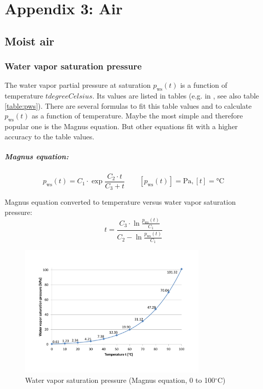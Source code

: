 \documentclass[11pt,a4paper,english,twoside]{scrreprt}
\newcommand{\gradC}{${}^\circ$C}      %
\begin{document}
\chapter{Appendix 3: Air}

\section{Moist air}
\label{chap:Moist air}

\subsection{Water vapor saturation pressure}

The water vapor partial pressure at saturation $p_\text{ws}(t)$ is a function of temperature $t\si{degreeCelsius}$. Its values are listed in tables (e.g. in \cite{HCP}, see also table \ref{table:pws}). There are several formulas to fit this table values and to calculate $p_\text{ws}(t)$ as a function of temperature. Maybe the most simple and therefore popular one is the Magnus equation. But other equations fit with a higher accuracy to the table values.

\paragraph{Magnus equation:}

\begin{equation}
  \label{eqn:Magnus}
  p_\text{ws}(t) =C_1 \cdot \exp \frac{C_2 \cdot t}{C_3 +t} \qquad [p_\text{ws}(t)] = \si{\pascal}, [t] = \si{\degreeCelsius} 
\end{equation}  

Magnus equation converted to temperature versus water vapor saturation pressure:
\[t=\frac{C_3 \cdot \ln \frac{p_\text{ws}(t)}{C_1}}{C_2 -\ln \frac{p_\text{ws}(t)}{C_1}}\]

\begin{figure}
  \centering
  \includegraphics*[width=0.8\textwidth,angle=0]{FCF_Diag_pws.pdf}
  \caption[Water vapor saturation pressure (Magnus equation)]{Water vapor saturation pressure (Magnus equation, 0 to 100\gradC) }
\end{figure}
\end{document}
